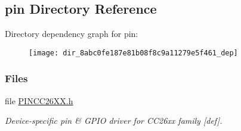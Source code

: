 \subsection{pin Directory Reference}
\label{dir_8abc0fe187e81b08f8c9a11279e5f461}
Directory dependency graph for pin\+:
\nopagebreak
\begin{figure}[H]
\begin{center}
\leavevmode
\texttt{[image: dir\_8abc0fe187e81b08f8c9a11279e5f461\_dep]}
\end{center}
\end{figure}
\subsubsection*{Files}
\begin{DoxyCompactItemize}
\item 
file \hyperlink{_p_i_n_c_c26_x_x_8h}{P\+I\+N\+C\+C26\+X\+X.\+h}
\begin{DoxyCompactList}\small\item\em Device-\/specific pin \& G\+P\+I\+O driver for C\+C26xx family \mbox{[}def\mbox{]}. \end{DoxyCompactList}\end{DoxyCompactItemize}

